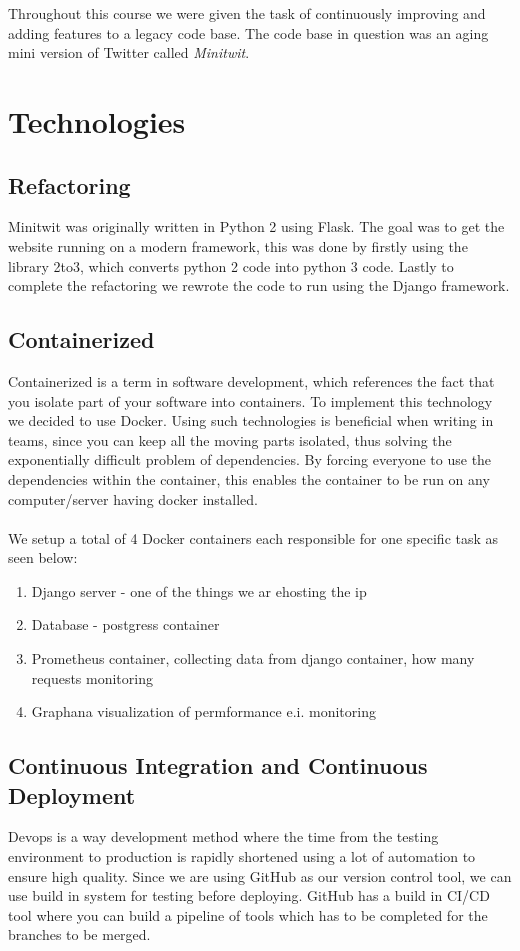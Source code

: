 Throughout this course we were given the task of continuously improving and adding features to a legacy code base. The code base in question was an aging mini version of Twitter called \textit{Minitwit}. 

\section*{Technologies}

\subsection*{Refactoring}

Minitwit was originally written in Python 2 using Flask. The goal was to get the website running on a modern framework, this was done by firstly using the library 2to3, which converts python 2 code into python 3 code. Lastly to complete the refactoring we rewrote the code to run using the Django framework.

\subsection*{Containerized}

Containerized is a term in software development, which references the fact that you isolate part of your software into containers. To implement this technology we decided to use Docker. Using such technologies is beneficial when writing in teams, since you can keep all the moving parts isolated, thus solving the exponentially difficult problem of dependencies. By forcing everyone to use the dependencies within the container, this enables the container to be run on any computer/server having docker installed.
\\\\
We setup a total of 4 Docker containers each responsible for one specific task as seen below:


\begin{enumerate}
    \item Django server - one of the things we ar ehosting the ip
    \item Database - postgress container 
    \item Prometheus container, collecting data from django container, how many requests monitoring
    \item Graphana visualization of permformance e.i. monitoring
\end{enumerate}

\subsection*{Continuous Integration and Continuous Deployment}
Devops is a way development method where the time from the testing environment to production is rapidly shortened using a lot of automation to ensure high quality. Since we are using GitHub as our version control tool, we can use build in system for testing before deploying. GitHub has a build in CI/CD tool where you can build a pipeline of tools which has to be completed for the branches to be merged.



